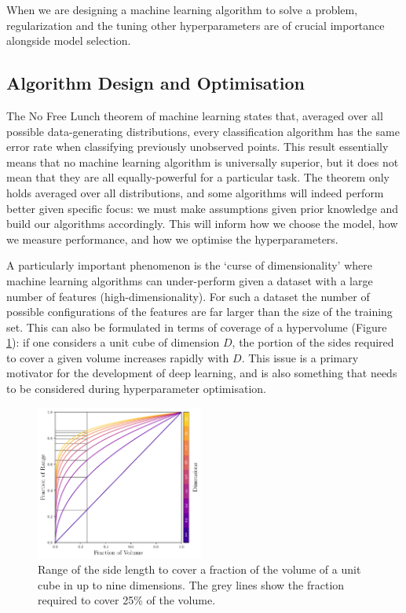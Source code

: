 When we are designing a machine learning algorithm to solve a problem, regularization and the tuning other hyperparameters are of crucial importance alongside model selection. 


\subsection{Algorithm Design and Optimisation}

The No Free Lunch theorem of machine learning states that, averaged over all possible data-generating distributions, every classification algorithm has the same error rate when classifying previously unobserved points.
This result essentially means that no machine learning algorithm is universally superior, but it does not mean that they are all equally-powerful for a particular task. 
The theorem only holds averaged over all distributions, and some algorithms will indeed perform better given specific focus: we must make assumptions given prior knowledge and build our algorithms accordingly.
This will inform how we choose the model, how we measure performance, and how we optimise the hyperparameters. 


A particularly important phenomenon is the `curse of dimensionality' where machine learning algorithms can under-perform given a dataset with a large number of features (high-dimensionality).
For such a dataset the number of possible configurations of the features are far larger than the size of the training set. 
This can also be formulated in terms of coverage of a hypervolume (Figure \ref{fig:machine_learning:curse_of_dimensionality}): if one considers a unit cube of dimension $D$, the portion of the sides required to cover a given volume increases rapidly with $D$.
This issue is a primary motivator for the development of deep learning, and is also something that needs to be considered during hyperparameter optimisation. 
\begin{figure}[h!]
    \begin{center}
        \includegraphics[width=0.49\textwidth]{figures/machine_learning/curse_of_dimensionality.pdf}
    \end{center}
    \caption{Range of the side length to cover a fraction of the volume of a unit cube in up to nine dimensions. The grey lines show the fraction required to cover 25\% of the volume.}
        \label{fig:machine_learning:curse_of_dimensionality}
\end{figure}



